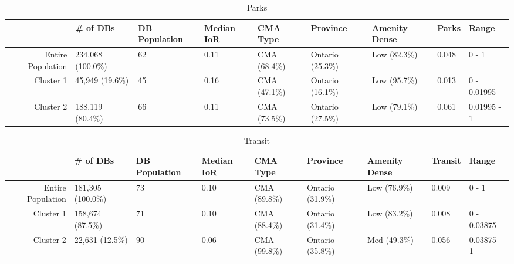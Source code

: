 \documentclass[10pt, a4paper]{article}
\begin{document}
 \pagebreak 
 
\begin{sidewaystable}[ht]
\centering
\begin{tabular}{rllllllll}
  \hline
 & \# of DBs & DB Population & Median IoR & CMA Type & Province & Amenity Dense & Parks & Range \\ 
  \hline
Entire Population & 234,068 (100.0\%) & 62 & 0.11 & CMA (68.4\%) & Ontario (25.3\%) & Low (82.3\%) & 0.048 & 0 - 1 \\ 
  Cluster 1 & 45,949 (19.6\%) & 45 & 0.16 & CMA (47.1\%) & Ontario (16.1\%) & Low (95.7\%) & 0.013 & 0 - 0.01995 \\ 
  Cluster 2 & 188,119 (80.4\%) & 66 & 0.11 & CMA (73.5\%) & Ontario (27.5\%) & Low (79.1\%) & 0.061 & 0.01995 - 1 \\ 
   \hline
\end{tabular}
\caption{Parks} 
\end{sidewaystable}





 \pagebreak 
 
\begin{sidewaystable}[ht]
\centering
\begin{tabular}{rllllllll}
  \hline
 & \# of DBs & DB Population & Median IoR & CMA Type & Province & Amenity Dense & Transit & Range \\ 
  \hline
Entire Population & 181,305 (100.0\%) & 73 & 0.10 & CMA (89.8\%) & Ontario (31.9\%) & Low (76.9\%) & 0.009 & 0 - 1 \\ 
  Cluster 1 & 158,674 (87.5\%) & 71 & 0.10 & CMA (88.4\%) & Ontario (31.4\%) & Low (83.2\%) & 0.008 & 0 - 0.03875 \\ 
  Cluster 2 & 22,631 (12.5\%) & 90 & 0.06 & CMA (99.8\%) & Ontario (35.8\%) & Med (49.3\%) & 0.056 & 0.03875 - 1 \\ 
   \hline
\end{tabular}
\caption{Transit} 
\end{sidewaystable}





 \pagebreak 
 

 
\end{document}
